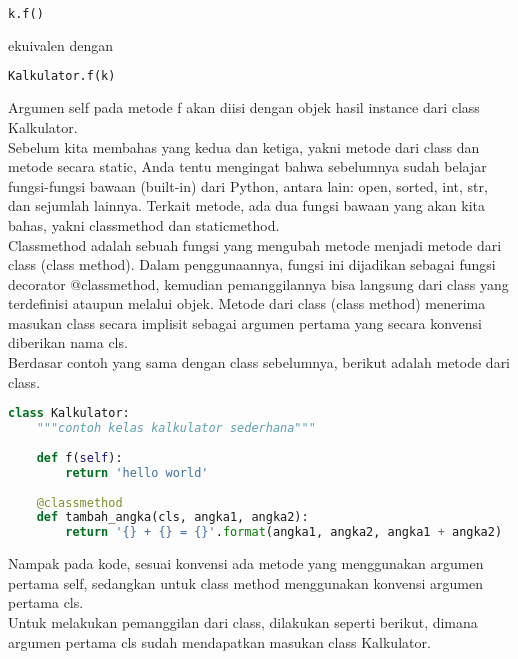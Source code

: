 \begin{lstlisting}[language=Python]
k.f()
\end{lstlisting}

ekuivalen dengan

\begin{lstlisting}[language=Python]
Kalkulator.f(k)
\end{lstlisting}

Argumen self pada metode f akan diisi dengan objek hasil instance dari class Kalkulator.\\

Sebelum kita membahas yang kedua dan ketiga, yakni metode dari class dan metode secara static, Anda tentu mengingat bahwa sebelumnya sudah belajar fungsi-fungsi bawaan (built-in) dari Python, antara lain: open, sorted, int, str, dan sejumlah lainnya. Terkait metode, ada dua fungsi bawaan yang akan kita bahas, yakni classmethod dan staticmethod.\\

Classmethod adalah sebuah fungsi yang mengubah metode menjadi metode dari class (class method). Dalam penggunaannya, fungsi ini dijadikan sebagai fungsi decorator @classmethod, kemudian pemanggilannya bisa langsung dari class yang terdefinisi ataupun melalui objek.
Metode dari class (class method) menerima masukan class secara implisit sebagai argumen pertama yang secara konvensi diberikan nama cls.\\

Berdasar contoh yang sama dengan class sebelumnya, berikut adalah metode dari class.\\

\begin{lstlisting}[language=Python]
class Kalkulator:
    """contoh kelas kalkulator sederhana"""
 
    def f(self):
        return 'hello world'
 
    @classmethod
    def tambah_angka(cls, angka1, angka2):
        return '{} + {} = {}'.format(angka1, angka2, angka1 + angka2)
\end{lstlisting}

Nampak pada kode, sesuai konvensi ada metode yang menggunakan argumen pertama self, sedangkan untuk class method menggunakan konvensi argumen pertama cls. \\

Untuk melakukan pemanggilan dari class, dilakukan seperti berikut, dimana argumen pertama cls sudah mendapatkan masukan class Kalkulator.\\

